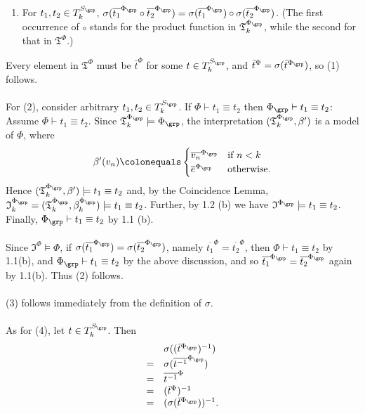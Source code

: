 \begin{enumerate}[1.]
\begin{enumerate}[(1)]
\item For $t_1, t_2 \in T_k^{S_\grp}$, $\sigma (\overline{t_1}^{\Phi_\grp} \circ \overline{t_2}^{\Phi_\grp}) = \sigma (\overline{t_1}^{\Phi_\grp}) \circ \sigma (\overline{t_2}^{\Phi_\grp})$. (The first occurrence of $\circ$ stands for the product function in $\mathfrak{T}_k^{\Phi_\grp}$, while the second for that in $\mathfrak{T}^\Phi$.)
\end{enumerate}
Every element in $\mathfrak{T}^\Phi$ must be $\bar{t}^\Phi$ for some $t \in T_k^{S_\grp}$, and $\bar{t}^\Phi = \sigma (\bar{t}^{\Phi_\grp})$, so (1) follows.\\
\ \\
For (2), consider arbitrary $t_1, t_2 \in T_k^{S_\grp}$. If $\Phi \vdash t_1 \equiv t_2$ then $\Phi_\grp \vdash t_1 \equiv t_2$: Assume $\Phi \vdash t_1 \equiv t_2$. Since $\mathfrak{T}_k^{\Phi_\grp} \models \Phi_\grp$, the interpretation $(\mathfrak{T}_k^{\Phi_\grp}, \beta^\prime)$ is a model of $\Phi$, where
\[
\beta^\prime (v_n) \colonequals \begin{cases}
\overline{v_n}^{\Phi_\grp} & \mbox{if \(n < k\)} \cr
\overline{e}^{\Phi_\grp} & \mbox{otherwise}.
\end{cases}
\]
Hence $(\mathfrak{T}_k^{\Phi_\grp}, \beta^\prime ) \models t_1 \equiv t_2$ and, by the Coincidence Lemma, $\mathfrak{I}_k^{\Phi_\grp} = (\mathfrak{T}_k^{\Phi_\grp}, \beta_k^{\Phi_\grp}) \models t_1 \equiv t_2$. Further, by 1.2 (b) we have $\mathfrak{I}^{\Phi_\grp} \models t_1 \equiv t_2$. Finally, $\Phi_\grp \vdash t_1 \equiv t_2$ by 1.1 (b).\\
\ \\
Since $\mathfrak{I}^\Phi \models \Phi$, if $\sigma (\overline{t_1}^{\Phi_\grp}) = \sigma (\overline{t_2}^{\Phi_\grp})$, namely $\overline{t_1}^\Phi = \overline{t_2}^\Phi$, then $\Phi \vdash t_1 \equiv t_2$ by 1.1(b), and $\Phi_\grp \vdash t_1 \equiv t_2$ by the above discussion, and so $\overline{t_1}^{\Phi_\grp} = \overline{t_2}^{\Phi_\grp}$ again by 1.1(b). Thus (2) follows.\\
\ \\
(3) follows immediately from the definition of $\sigma$.\\
\ \\
As for (4), let $t \in T_k^{S_\grp}$. Then
\[
\begin{array}{ll}
\ & \sigma ((\bar{t}^{\Phi_\grp})^{-1}) \cr
= & \sigma (\overline{t^{-1}}^{\Phi_\grp}) \cr
= & \overline{t^{-1}}^\Phi \cr
= & (\bar{t}^\Phi )^{-1} \cr
= & (\sigma (\bar{t}^{\Phi_\grp}))^{-1}.
\end{array}
\]
\end{enumerate}
